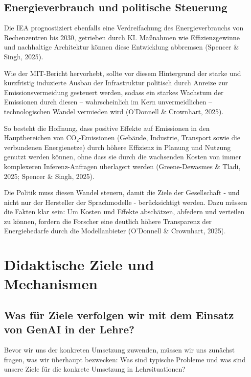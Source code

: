 \documentclass[
  ngerman,
  letterpaper,
  DIV=11]{scrreprt}
\begin{document}
\section{Energieverbrauch und politische
Steuerung}\label{sec-energy-politics}

Die IEA prognostiziert ebenfalls eine Verdreifachung des
Energieverbrauchs von Rechenzentren bis 2030, getrieben durch KI.
Maßnahmen wie Effizienzgewinne und nachhaltige Architektur können diese
Entwicklung abbremsen (Spencer \& Singh, 2025).

Wie der MIT-Bericht hervorhebt, sollte vor diesem Hintergrund der starke
und kurzfristig induzierte Ausbau der Infrastruktur politisch durch
Anreize zur Emissionsvermeidung gesteuert werden, sodass ein starkes
Wachstum der Emissionen durch diesen -- wahrscheinlich im Kern
unvermeidlichen -- technologischen Wandel vermieden wird (O'Donnell \&
Crownhart, 2025).

So besteht die Hoffnung, dass positive Effekte auf Emissionen in den
Hauptbereichen von CO₂-Emissionen (Gebäude, Industrie, Transport sowie
die verbundenen Energienetze) durch höhere Effizienz in Planung und
Nutzung genutzt werden können, ohne dass sie durch die wachsenden Kosten
von immer komplexeren Inferenz-Anfragen überlagert werden
(Greene-Dewasmes \& Tladi, 2025; Spencer \& Singh, 2025).

Die Politik muss diesen Wandel steuern, damit die Ziele der Gesellschaft
- und nicht nur der Hersteller der Sprachmodelle - berücksichtigt
werden. Dazu müssen die Fakten klar sein: Um Kosten und Effekte
abschätzen, abfedern und verteilen zu können, fordern die Forscher eine
deutlich höhere Transparenz der Energiebedarfe durch die Modellanbieter
(O'Donnell \& Crownhart, 2025).


\chapter{Didaktische Ziele und Mechanismen}\label{sec-didaktik}

\section{Was für Ziele verfolgen wir mit dem Einsatz von GenAI in der
Lehre?}\label{sec-ziele-genai}

Bevor wir uns der konkreten Umsetzung zuwenden, müssen wir uns zunächst
fragen, was wir überhaupt bezwecken: Was sind typische Probleme und was
sind unsere Ziele für die konkrete Umsetzung in Lehrsituationen?
\end{document}
